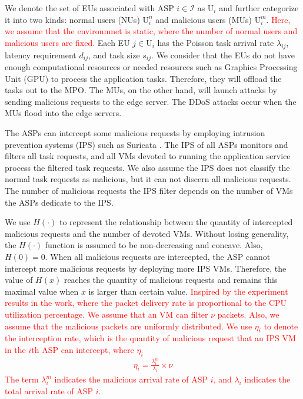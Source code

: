 \documentclass[10pt,journal, compsoc]{IEEEtran}
\begin{document}
We denote the set of EUs associated with ASP $i \in \mathcal{I}$ as $\mathrm{U}_i$ and further categorize it into two kinds: normal users (NUs) $\mathrm{U}_i^n$ and malicious users (MUs) $\mathrm{U}_i^m$. \textcolor{red}{Here, we assume that the environmnet is static, where the number of normal users and malicious users are fixed.} Each EU $j \in \mathrm{U}_i$ has the Poisson task arrival rate $\lambda_{ij}$, latency requirement $d_{ij}$, and task size $s_{ij}$. We consider that the EUs do not have enough computational resources or needed resources such as Graphics Processing Unit (GPU) to process the application tasks. Therefore, they will offload the tasks out to the MPO. The MUs, on the other hand, will launch attacks by sending malicious requests to the edge server. The DDoS attacks occur when the MUs flood into the edge servers. 

The ASPs can intercept some malicious requests by employing intrusion prevention systems (IPS) such as Suricata \cite{Suricata}. The IPS of all ASPs monitors and filters all task requests, and all VMs devoted to running the application service process the filtered task requests. We also assume the IPS does not classify the normal task requests as malicious, but it can not discern all malicious requests. The number of malicious requests the IPS filter depends on the number of VMs the ASPs dedicate to the IPS. 

We use $H(\cdot)$ to represent the relationship between the quantity of intercepted malicious requests and the number of devoted VMs. Without losing generality, the $H(\cdot)$ function is assumed to be non-decreasing and concave. Also, $H(0)=0$.
When all malicious requests are intercepted, the ASP cannot intercept more malicious requests by deploying more IPS VMs. Therefore, the value of $H(x)$ reaches the quantity of malicious requests and remains this maximal value when $x$ is larger than certain value. \textcolor{red}{Inspired by the experiment results in the work\cite{chi}, where the packet delivery rate is proportional to the CPU utilization percentage. We assume that an VM can filter $\nu$ packets. Also, we assume that the malicious packets are uniformly distributed. We use $\eta_i$ to denote the interception rate, which is the quantity of malicious request that an IPS VM in the $i$th ASP can intercept, where $\eta_i$
\begin{equation}
   \begin{aligned}
    \eta_i = \frac{\lambda_i^m}{\lambda_i} \times \nu
    \end{aligned} 
\end{equation}
The term $\lambda_i^m$ indicates the malicious arrival rate of ASP $i$, and $\lambda_i$ indicates the total arrival rate of ASP $i$.}
\end{document}
